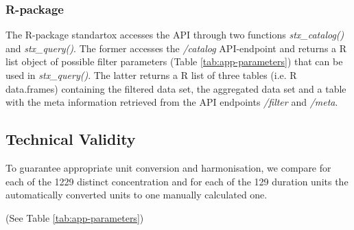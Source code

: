 \subsubsection{R-package}
The R-package standartox accesses the API through two functions \textit{stx\_catalog()} and \textit{stx\_query()}. The former accesses the \textit{/catalog} API-endpoint and returns a R list object of possible filter parameters (Table \ref{tab:app-parameters}) that can be used in \textit{stx\_query()}. The latter returns a R list of three tables (i.e. R data.frames) containing the filtered data set, the aggregated data set and a table with the meta information retrieved from the API endpoints \textit{/filter} and \textit{/meta}.

\subsection{Technical Validity}
To guarantee appropriate unit conversion and harmonisation, we compare for each of the 1229 distinct concentration and for each of the 129 duration units the automatically converted units to one manually calculated one.


(See Table \ref{tab:app-parameters})




\iffalse
- Endpoint: For the last parameter here, only be exclusive. 

TODO: How does this fit?
\begin{table}
    
    \caption{Reduction of data in the compilation process for Standartox}
    \label{tab:data-refinement}
\end{table}

\fi


\iffalse
\textbf{OLD: Standartox aggregates the test results according to chosen filters in a two step process. Firstly the filtered test results are aggregated by the CAS number, the chosen taxon and the selected test duration. Secondly, the returned data is then aggregated by the CAS number. The former can't be influenced by the user and calculates either the minimum or the median depending on the amount of results to aggregate (n <= 2: minimum, if n > 2: median). Thereof the second step calculates the minimum, the maximum, the median, the geometric mean, or the arithmetic mean as an aggregate.}
\fi


